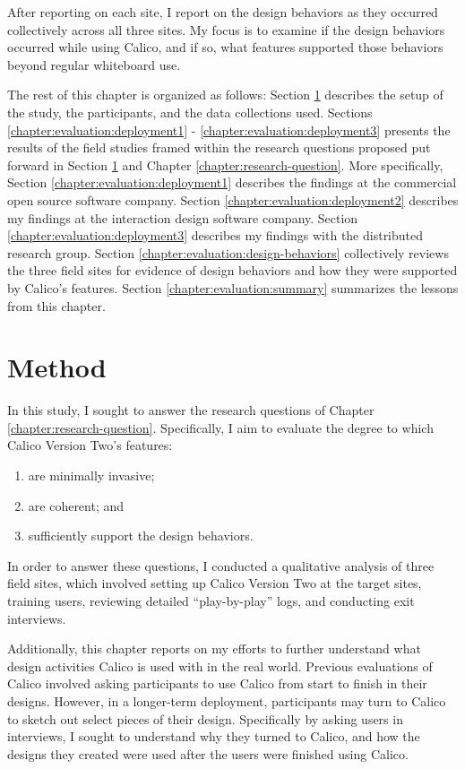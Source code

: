 After reporting on each site, I report on the design behaviors as they occurred collectively across all three sites. My focus is to examine if the design behaviors occurred  while using Calico, and if so, what features supported those behaviors beyond regular whiteboard use.

The rest of this chapter is organized as follows: Section \ref{chapter:evaluation:overview} describes the setup of the study, the participants, and the data collections used. Sections \ref{chapter:evaluation:deployment1} - \ref{chapter:evaluation:deployment3} presents the results of the field studies framed within the research questions proposed put forward in Section \ref{chapter:evaluation:overview} and Chapter \ref{chapter:research-question}. More specifically, Section \ref{chapter:evaluation:deployment1} describes the findings at the commercial open source software company. Section \ref{chapter:evaluation:deployment2} describes my findings at the interaction design software company. Section \ref{chapter:evaluation:deployment3} describes my findings with the distributed research group. Section \ref{chapter:evaluation:design-behaviors} collectively reviews the three field sites for evidence of design behaviors and how they were supported by Calico's features. Section \ref{chapter:evaluation:summary} summarizes the lessons from this chapter.

\section{Method}
\label{chapter:evaluation:overview}

In this study, I sought to answer the research questions of Chapter \ref{chapter:research-question}. Specifically, I aim to evaluate the degree to which Calico Version Two's features:

\begin{enumerate}
	\item are minimally invasive;
	\item are coherent; and
	\item sufficiently support the design behaviors.
\end{enumerate}

In order to answer these questions, I conducted a qualitative analysis of three field sites, which involved setting up Calico Version Two at the target sites, training users, reviewing detailed ``play-by-play'' logs, and conducting exit interviews. 

Additionally, this chapter reports on my efforts to further understand what design activities Calico is used with in the real world. Previous evaluations of Calico involved asking participants to use Calico from start to finish in their designs. However, in a longer-term deployment, participants may turn to Calico to sketch out select pieces of their design. Specifically by asking users in interviews, I sought to understand why they turned to Calico, and how the designs they created were used after the users were finished using Calico.

